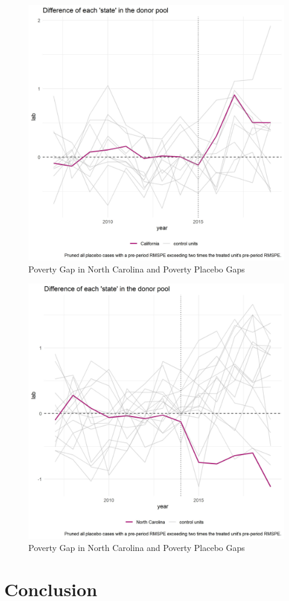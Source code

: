 \documentclass{article}
\begin{document}
 \begin{figure}[H]
    \caption{Poverty Gap in North Carolina and Poverty Placebo Gaps}
    \begin{center}
        \includegraphics[width=.85\textwidth]{ca_lab_placebos}
    \end{center}
    \label{fig:ca_lab_placebos}{}
\end{figure}

 \begin{figure}[H]
    \caption{Poverty Gap in North Carolina and Poverty Placebo Gaps}
    \begin{center}
        \includegraphics[width=.85\textwidth]{nc_lab_placebos}
    \end{center}
    \label{fig:nc_lab_placebos}{}
\end{figure}

\section{Conclusion}

{}

\end{document}
